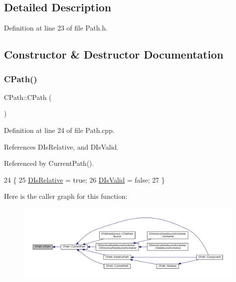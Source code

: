 \subsection{Detailed Description}


Definition at line 23 of file Path.\+h.



\subsection{Constructor \& Destructor Documentation}
\hypertarget{classCPath_a26b6e34c8019d440136848f809c13897}{}\label{classCPath_a26b6e34c8019d440136848f809c13897} 
\subsubsection{\texorpdfstring{C\+Path()}{CPath()}\hspace{0.1cm}{\footnotesize\ttfamily [1/3]}}
{\footnotesize\ttfamily C\+Path\+::\+C\+Path (\begin{DoxyParamCaption}{ }\end{DoxyParamCaption})}



Definition at line 24 of file Path.\+cpp.



References D\+Is\+Relative, and D\+Is\+Valid.



Referenced by Current\+Path().


\begin{DoxyCode}
24             \{
25     \hyperlink{classCPath_af705ff149bb2281c67afb84fff550eb9}{DIsRelative} = \textcolor{keyword}{true};
26     \hyperlink{classCPath_a992aca27a1cba1c3bae3d04438821192}{DIsValid} = \textcolor{keyword}{false};
27 \}
\end{DoxyCode}
Here is the caller graph for this function\+:\nopagebreak
\begin{figure}[H]
\begin{center}
\leavevmode
\includegraphics[width=350pt]{classCPath_a26b6e34c8019d440136848f809c13897_icgraph}
\end{center}
\end{figure}
\hypertarget{classCPath_a728b9e9aea13c9dc51b9bb1f6dbc76fd}{}\label{classCPath_a728b9e9aea13c9dc51b9bb1f6dbc76fd} 
